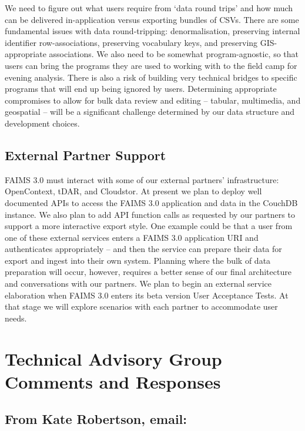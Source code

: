 \documentclass[a4paper,headings=small fontsize=10pt]{scrreprt}
\begin{document}
We need to figure out what users require from `data round trips' and how
much can be delivered in-application versus exporting bundles of CSVs.
There are some fundamental issues with data round-tripping:
denormalisation, preserving internal identifier row-associations,
preserving vocabulary keys, and preserving GIS-appropriate associations.
We also need to be somewhat program-agnostic, so that users can bring
the programs they are used to working with to the field camp for evening
analysis. There is also a risk of building very technical bridges to
specific programs that will end up being ignored by users. Determining
appropriate compromises to allow for bulk data review and editing --
tabular, multimedia, and geospatial -- will be a significant challenge
determined by our data structure and development choices.

\section{External Partner Support}

FAIMS 3.0 must interact with some of our external partners'
infrastructure: OpenContext, tDAR, and Cloudstor. At present we plan to
deploy well documented APIs to access the FAIMS 3.0 application and data
in the CouchDB instance. We also plan to add API function calls as
requested by our partners to support a more interactive export style.
One example could be that a user from one of these external services
enters a FAIMS 3.0 application URI and authenticates appropriately --
and then the service can prepare their data for export and ingest into
their own system. Planning where the bulk of data preparation will
occur, however, requires a better sense of our final architecture and
conversations with our partners. We plan to begin an external service
elaboration when FAIMS 3.0 enters its beta version User Acceptance
Tests. At that stage we will explore scenarios with each partner to
accommodate user needs.

\printbibliography


\chapter{Technical Advisory Group
Comments and Responses}

\section{From Kate Robertson,
email:}
\end{document}
